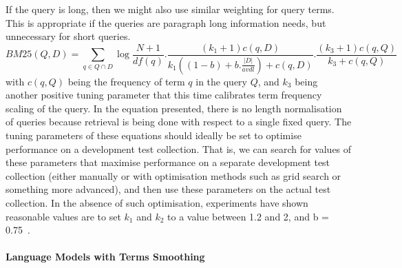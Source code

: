 If the query is long, then we might also use similar weighting for query terms. This is appropriate if the queries are paragraph long information needs, but unnecessary for short queries.
\begin{equation}
BM25(Q,D)=\sum\limits_{q \in Q\cap D}\log\frac{N+1}{df(q)}.\frac{(k_{1}+1)c(q,D)}{k_{1}((1-b)+b.\frac{|D|}{avdl})+c(q,D)}.\frac{(k_{3}+1)c(q,Q)}{k_{3}+c(q,Q)}
\label{eq:idfbm25}
\end{equation}
with $ c(q,Q) $ being the frequency of term $ q $ in the query $ Q $, and $ k_{3} $ being another positive tuning parameter that this time calibrates term frequency scaling of the query. In the equation presented, there is no length normalisation of
queries because retrieval is being done with respect to a single fixed query. The tuning parameters of these equations should ideally be set to optimise performance on a development test collection. That is, we can search for values of these parameters that maximise performance on a separate development test collection (either manually or with optimisation methods such as grid search or something more advanced), and then use these parameters on the actual test collection. In the absence of such optimisation, experiments have shown reasonable values are to set $ k_{1} $ and $ k_{2} $ to a value between 1.2 and 2, and b = 0.75~\citep{manning2008introduction}.

\paragraph{Language Models with Terms Smoothing}
\ \\
